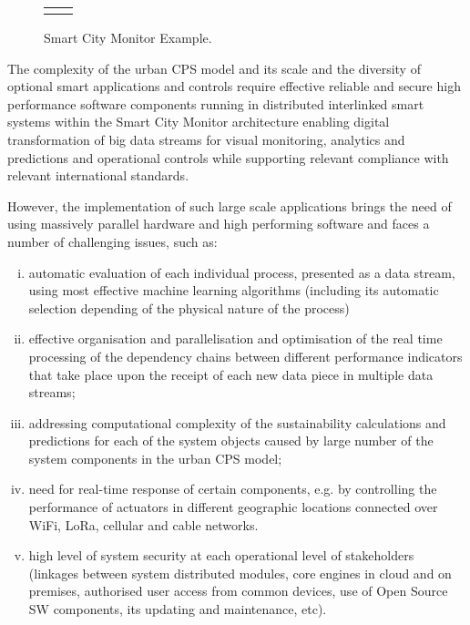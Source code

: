 \documentclass[a4paper,11pt]{article}
\begin{document}
\begin{figure}
\begin{center}
\begin{tabular}{ll}
[scale=0.5]{Jeglava.jpg}
\end{tabular}
\caption{Smart City Monitor Example.}
\label{fig:smartCityMonitor}
\end{center}
\end{figure}

The complexity of the urban CPS model and its scale and the diversity of optional smart applications and controls require effective reliable and secure high performance software components running in distributed interlinked smart systems within the Smart City Monitor architecture enabling digital transformation of big data streams for visual monitoring, analytics and predictions and operational controls  while supporting relevant compliance with relevant international standards.

However, the implementation of such large scale applications brings the need of using massively parallel hardware and high performing software and faces a number of challenging issues, such as:
\begin{enumerate}[i)]
\item automatic evaluation of each individual process, presented as a data stream, using most effective machine learning algorithms (including its automatic selection depending of the physical nature of the process)
\item effective organisation and parallelisation and optimisation of the real time processing of the dependency chains between different performance indicators that take place upon the receipt of each new data piece in multiple data streams; 
\item addressing computational complexity of the sustainability calculations and predictions for each of the system objects caused by large number of the system components in the urban CPS model;
\item need for real-time response of certain components, e.g. by controlling the performance of actuators in different geographic locations connected over WiFi, LoRa, cellular and cable networks. 
\item high level of system security at each operational level of stakeholders (linkages between system distributed modules, core engines in cloud and on premises, authorised user access from common devices, use of  Open Source SW components, its updating and maintenance, etc).
\end{enumerate}
\end{document}
